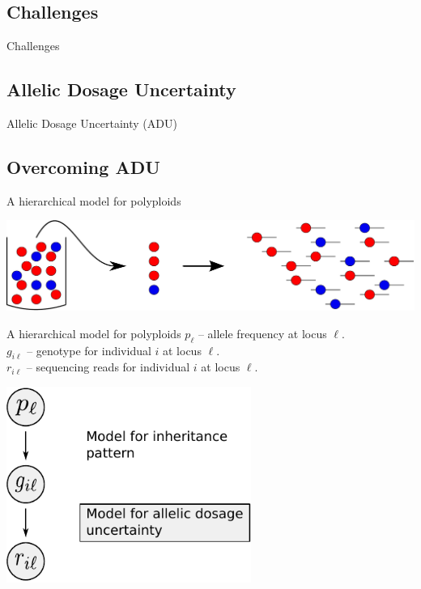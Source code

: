 \documentclass[presentation]{beamer}
\begin{document}
\subsection{Challenges}

\begin{frame}[t]{Challenges}

\end{frame}

\subsection{Allelic Dosage Uncertainty}

\begin{frame}[t]{Allelic Dosage Uncertainty (ADU)}

\end{frame}

\subsection{Overcoming ADU}

\begin{frame}[c]{A hierarchical model for polyploids}
	\begin{center}
		\includegraphics[width=\textwidth]{fig/pop-gen-model-empty}
	\end{center}
\end{frame}

\begin{frame}[c]{A hierarchical model for polyploids}
	$p_{\ell}$ -- allele frequency at locus $\ell$. \\
	$g_{i \ell}$ -- genotype for individual $i$ at locus $\ell$. \\
	$r_{i \ell}$ -- sequencing reads for individual $i$ at locus $\ell$.
	\vspace{0.1in}
	\begin{center}
		\includegraphics[width=0.6\textwidth]{fig/figure1-model-graph}
	\end{center}
\end{frame}
\end{document}
